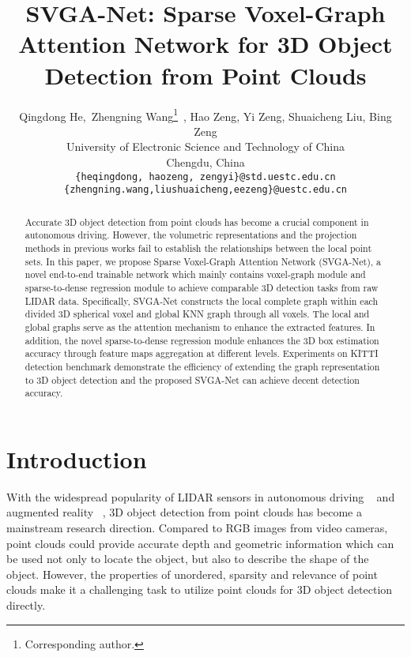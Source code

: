 \documentclass{article}
\title{SVGA-Net: Sparse Voxel-Graph Attention Network for 3D Object Detection from Point Clouds}
\author{Qingdong He,\ Zhengning Wang\thanks{Corresponding author.}\  , Hao Zeng, Yi Zeng, Shuaicheng Liu, Bing Zeng\\
   University of Electronic Science and Technology of China \\
  Chengdu, China\\
  \texttt{\{heqingdong, haozeng, zengyi\}@std.uestc.edu.cn}\\
  \texttt{\{zhengning.wang,liushuaicheng,eezeng\}@uestc.edu.cn} \\
}
\begin{document}
\maketitle

\begin{abstract}
  Accurate 3D object detection from point clouds has become a crucial component in autonomous driving. However, the volumetric representations and the projection methods in previous works fail to establish the relationships between the local point sets. In this paper, we propose Sparse Voxel-Graph Attention Network (SVGA-Net), a novel end-to-end trainable network which mainly contains voxel-graph module and sparse-to-dense regression module to achieve comparable 3D detection tasks from raw LIDAR data. Specifically, SVGA-Net constructs the local complete graph within each divided 3D spherical voxel and global KNN graph through all voxels. The local and global graphs serve as the attention mechanism to enhance the extracted features. In addition, the novel sparse-to-dense regression module enhances the 3D box estimation accuracy through feature maps aggregation at different levels. Experiments on KITTI detection benchmark demonstrate the efficiency of extending the graph representation to 3D object detection and the proposed SVGA-Net can achieve decent detection accuracy.
\end{abstract}

\section{Introduction}
With the widespread popularity of LIDAR sensors in autonomous driving ~\cite{geiger2012we} and augmented reality ~\cite{Park:2008:MOT:1605298.1605357}, 3D object detection from point clouds has become a mainstream research direction. Compared to RGB images from video cameras, point clouds could provide accurate depth and geometric information which can be used not only to locate the object, but also to describe the shape of the object. However, the properties of unordered, sparsity and relevance of point clouds make it a challenging task to utilize point clouds for 3D object detection directly.
\end{document}
